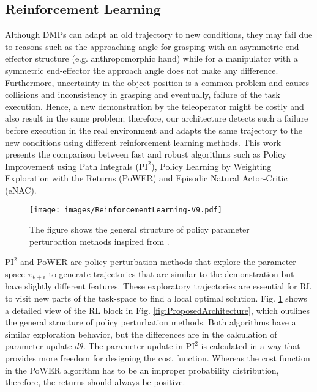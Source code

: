 \documentclass[letterpaper, 10 pt, conference]{ieeeconf}  %
\begin{document}
\subsection{Reinforcement Learning}
Although DMPs can adapt an old trajectory to new conditions, they may fail due to reasons such as the approaching angle for grasping with an asymmetric end-effector structure (e.g. anthropomorphic hand) while for a manipulator with a symmetric end-effector the approach angle does not make any difference. Furthermore, uncertainty in the object position is a common problem and causes collisions and inconsistency in grasping and eventually, failure of the task execution. Hence, a new demonstration by the teleoperator might be costly and also result in the same problem; therefore, our architecture detects such a failure before execution in the real environment and adapts the same trajectory to the new conditions using different reinforcement learning methods.
This work presents the comparison between fast and robust algorithms such as Policy Improvement using Path Integrals ($\textrm{PI}^2$), Policy Learning by Weighting Exploration with the Returns (PoWER) and Episodic Natural Actor-Critic (eNAC).
\begin{figure}[b]
    \centering
    \texttt{[image: images/ReinforcementLearning-V9.pdf]}
    \caption[The general structure of policy parameter perturbation methods]{The figure shows the general structure of policy parameter perturbation methods inspired from \cite{freekpi2}.}
    \label{fig:Reinforcementlearning}
\end{figure}

\noindent
$\textrm{PI}^2$ and PoWER are policy perturbation methods that explore the parameter space $\pi_{\theta+\epsilon}$ to generate trajectories that are similar to the demonstration but have slightly different features. These exploratory trajectories are essential for RL to visit new parts of the task-space to find a local optimal solution. Fig. \ref{fig:Reinforcementlearning} shows a detailed view of the RL block in Fig. \ref{fig:ProposedArchitecture}, which outlines the general structure of policy perturbation methods. Both algorithms have a similar exploration behavior, but the differences are in the calculation of parameter update $d\theta$. The parameter update in $\textrm{PI}^2$ is calculated in a way that provides more freedom for designing the cost function. Whereas the cost function in the PoWER algorithm has to be an improper probability distribution, therefore, the returns should always be positive. 
\end{document}
